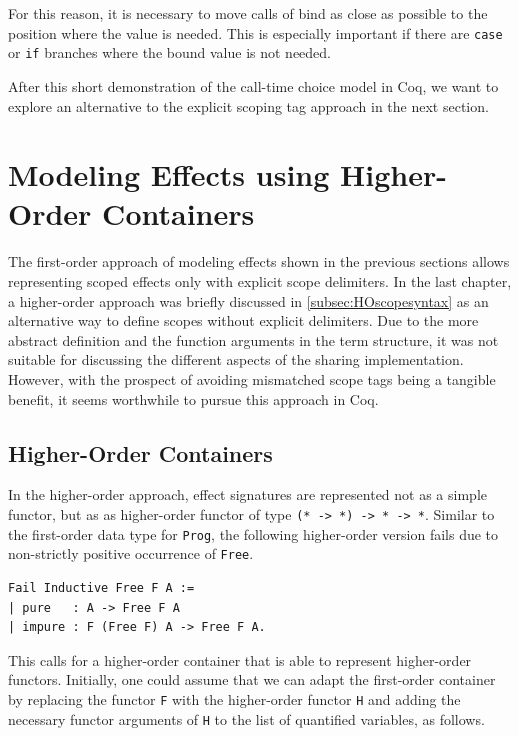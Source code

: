 \documentclass[a4paper, 11pt, fleqn, twoside]{scrreprt}
\newcommand{\hinl}[1]{\texttt{#1}}
\newcommand{\cinl}[1]{\texttt{#1}}
\begin{document}
For this reason, it is necessary to move calls of bind as close as possible to the position where the value is needed.
This is especially important if there are \cinl{case} or \cinl{if} branches where the bound value is not needed.

After this short demonstration of the call-time choice model in Coq, we want to explore an alternative to the explicit scoping tag approach in the next section.

\section{Modeling Effects using Higher-Order Containers}
\label{sec:coqHO}

The first-order approach of modeling effects shown in the previous sections allows representing scoped effects only with explicit scope delimiters.
In the last chapter, a higher-order approach was briefly discussed in \autoref{subsec:HOscopesyntax} as an alternative way to define scopes without explicit delimiters.
Due to the more abstract definition and the function arguments in the term structure, it was not suitable for discussing the different aspects of the sharing implementation.
However, with the prospect of avoiding mismatched scope tags being a tangible benefit, it seems worthwhile to pursue this approach in Coq.

\subsection{Higher-Order Containers}
\label{subsec-higherOrderContainers}
In the higher-order approach, effect signatures are represented not as a simple functor, but as as higher-order functor of type \hinl{(* -> *) -> * -> *}.
Similar to the first-order data type for \hinl{Prog}, the following higher-order version fails due to non-strictly positive occurrence of \cinl{Free}.

\begin{verbatim}
Fail Inductive Free F A :=
| pure   : A -> Free F A
| impure : F (Free F) A -> Free F A.
\end{verbatim}

This calls for a higher-order container that is able to represent higher-order functors.
Initially, one could assume that we can adapt the first-order container by replacing the functor \cinl{F} with the higher-order functor \cinl{H} and adding the necessary functor arguments of \cinl{H} to the list of quantified variables, as follows.
\end{document}
